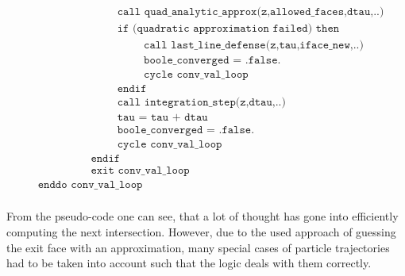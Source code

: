 \documentclass[./main.tex]{subfiles}
\begin{document}
\begin{align*}
&\hspace{3cm} \texttt{call quad\_analytic\_approx(z,allowed\_faces,dtau,..)}\nonumber\\
&\hspace{3cm} \texttt{if (quadratic approximation failed) then}\nonumber\\
&\hspace{4cm} \texttt{call last\_line\_defense(z,tau,iface\_new,..)}\nonumber\\
&\hspace{4cm} \texttt{boole\_converged = .false.}\nonumber\\
&\hspace{4cm} \texttt{cycle conv\_val\_loop}\nonumber\\
&\hspace{3cm} \texttt{endif}\nonumber\\
&\hspace{3cm} \texttt{call integration\_step(z,dtau,..)}\nonumber\\
&\hspace{3cm} \texttt{tau = tau + dtau}\nonumber\\
&\hspace{3cm} \texttt{boole\_converged = .false.}\nonumber\\
&\hspace{3cm} \texttt{cycle conv\_val\_loop}\nonumber\\
&\hspace{2cm} \texttt{endif}\nonumber\\
&\hspace{2cm} \texttt{exit conv\_val\_loop}\nonumber\\
&\texttt{enddo conv\_val\_loop}\nonumber\\
\end{align*}

From the pseudo-code one can see, that a lot of thought has gone into efficiently computing the next intersection. However, due to the used approach of guessing the exit face with an approximation, many special cases of particle trajectories had to be taken into account such that the logic deals with them correctly.
\end{document}
